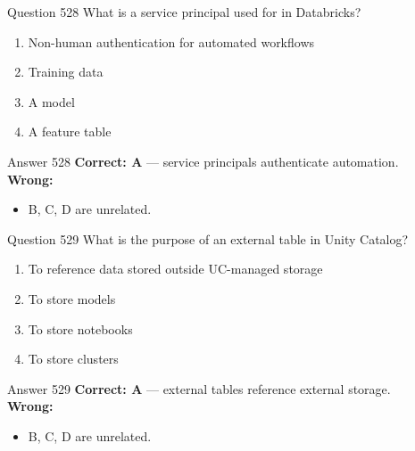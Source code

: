 \documentclass[aspectratio=169,11pt]{beamer}
\begin{document}
	\begin{frame}{Question 528}
		What is a service principal used for in Databricks?
		\begin{enumerate}[label=\Alph*.]
			\item Non-human authentication for automated workflows
			\item Training data
			\item A model
			\item A feature table
		\end{enumerate}
	\end{frame}
	\begin{frame}{Answer 528}
		\textbf{Correct: A} --- service principals authenticate automation.\\
		\vspace{0.5em}
		\textbf{Wrong:}
		\begin{itemize}
			\item B, C, D are unrelated.
		\end{itemize}
	\end{frame}
	
	\begin{frame}{Question 529}
		What is the purpose of an external table in Unity Catalog?
		\begin{enumerate}[label=\Alph*.]
			\item To reference data stored outside UC-managed storage
			\item To store models
			\item To store notebooks
			\item To store clusters
		\end{enumerate}
	\end{frame}
	\begin{frame}{Answer 529}
		\textbf{Correct: A} --- external tables reference external storage.\\
		\vspace{0.5em}
		\textbf{Wrong:}
		\begin{itemize}
			\item B, C, D are unrelated.
		\end{itemize}
	\end{frame}
	
\end{document}
